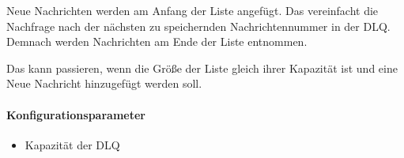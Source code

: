\documentclass{article}
\begin{document}
Neue Nachrichten werden am Anfang der Liste angefügt. Das vereinfacht die Nachfrage nach der nächsten zu speichernden Nachrichtennummer in der DLQ. Demnach werden Nachrichten am Ende der Liste entnommen.

Das kann passieren, wenn die Größe der Liste gleich ihrer Kapazität ist und eine Neue Nachricht hinzugefügt werden soll.

\paragraph{Konfigurationsparameter}
\begin{itemize}
    \item Kapazität der DLQ
\end{itemize}
\end{document}

